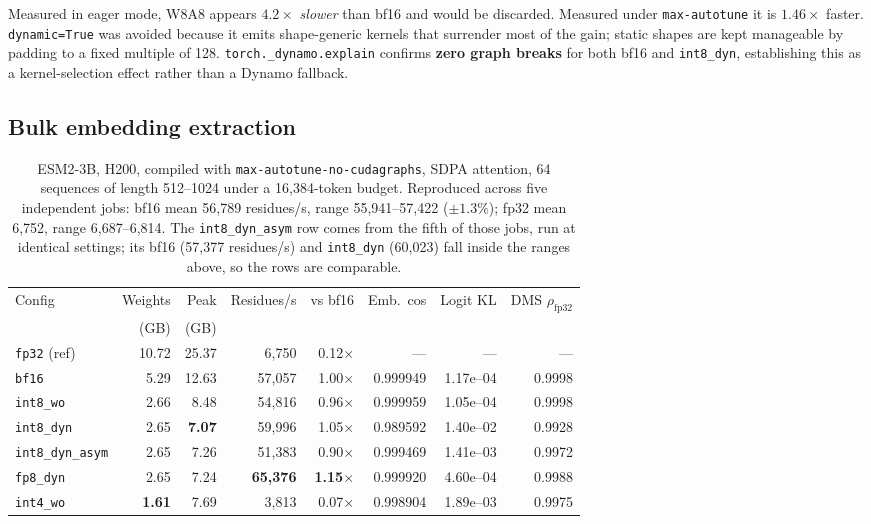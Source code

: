 \documentclass[11pt]{article}
\newcommand{\cfg}[1]{\texttt{#1}}
\newcommand{\best}[1]{\textbf{#1}}
\begin{document}
Measured in eager mode, W8A8 appears $4.2\times$ \emph{slower} than bf16 and
would be discarded. Measured under \texttt{max-autotune} it is $1.46\times$
faster. \texttt{dynamic=True} was avoided because it emits shape-generic kernels
that surrender most of the gain; static shapes are kept manageable by padding to
a fixed multiple of 128. \texttt{torch.\_dynamo.explain} confirms \textbf{zero
graph breaks} for both bf16 and \cfg{int8\_dyn}, establishing this as a
kernel-selection effect rather than a Dynamo fallback.

\subsection{Bulk embedding extraction}

\begin{table}[htb]
\centering
\caption{ESM2-3B, H200, compiled with \texttt{max-autotune-no-cudagraphs}, SDPA
attention, 64 sequences of length 512--1024 under a 16{,}384-token budget.
Reproduced across five independent jobs: bf16 mean 56{,}789 residues/s, range
55{,}941--57{,}422 ($\pm 1.3\%$); fp32 mean 6{,}752, range 6{,}687--6{,}814. The
\cfg{int8\_dyn\_asym} row comes from the fifth of those jobs, run at identical
settings; its bf16 (57{,}377 residues/s) and \cfg{int8\_dyn} (60{,}023) fall
inside the ranges above, so the rows are comparable.}
\label{tab:bulk}
\small
\begin{tabular}{lrrrrrrr}
\toprule
Config & Weights & Peak & Residues/s & vs bf16 & Emb.\ cos & Logit KL & DMS $\rho_{\text{fp32}}$ \\
       & (GB)    & (GB) &            &         &           &          & \\
\midrule
\cfg{fp32} (ref)  & 10.72 & 25.37 &  6{,}750 & 0.12$\times$ & ---      & ---      & --- \\
\cfg{bf16}        &  5.29 & 12.63 & 57{,}057 & 1.00$\times$ & 0.999949 & 1.17e--04 & 0.9998 \\
\cfg{int8\_wo}    &  2.66 &  8.48 & 54{,}816 & 0.96$\times$ & 0.999959 & 1.05e--04 & 0.9998 \\
\cfg{int8\_dyn}   &  2.65 & \best{7.07} & 59{,}996 & 1.05$\times$ & 0.989592 & 1.40e--02 & 0.9928 \\
\cfg{int8\_dyn\_asym} & 2.65 &  7.26 & 51{,}383 & 0.90$\times$ & 0.999469 & 1.41e--03 & 0.9972 \\
\cfg{fp8\_dyn}    &  2.65 &  7.24 & \best{65{,}376} & \best{1.15$\times$} & 0.999920 & 4.60e--04 & 0.9988 \\
\cfg{int4\_wo}    & \best{1.61} &  7.69 &  3{,}813 & 0.07$\times$ & 0.998904 & 1.89e--03 & 0.9975 \\
\bottomrule
\end{tabular}
\end{table}
\end{document}
